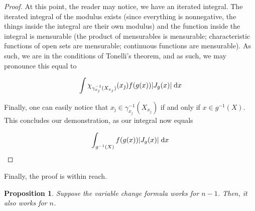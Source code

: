 \documentclass[11pt]{article}
\theoremstyle{definition}
\theoremstyle{plain}
\newtheorem{prop}{Proposition}
\newcommand{\mo}{^{-1}}
\begin{document}
\begin{proof}
At this point, the reader may notice, we have an iterated integral. The iterated integral of the modulus exists (since everything is nonnegative, the things inside the integral are their own modulus) and the function inside the integral is mensurable (the product of mensurables is mensurable; characteristic functions of open sets are mensurable; continuous functions are mensurable). As such, we are in the conditions of Tonelli's theorem, and as such, we may pronounce this equal to

\[ \int \chi_{\gamma_{x_j}\mo(X_{x_j})}(x_{\hat\jmath}) f(g(x)) \lvert J_g(x) \rvert \d{x} \]

Finally, one can easily notice that $x_{\hat\jmath} \in \gamma_{x_j}\mo(X_{x_j})$ if and only if ${x \in g\mo(X)}$. This concludes our demonstration, as our integral now equals

\[ \int_{g\mo(X)} f(g(x)) \lvert J_g(x) \rvert \d{x} \]
\end{proof}

Finally, the proof is within reach.

\begin{prop}
Suppose the variable change formula works for $n-1$. Then, it also works for $n$.
\end{prop}
\end{document}

